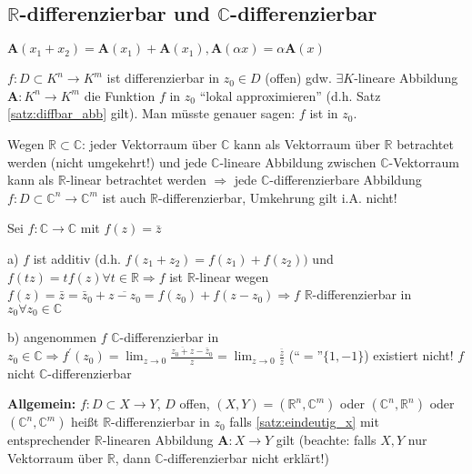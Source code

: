 \subsection{$\mathbb{R}$-differenzierbar und $\mathbb{C}$-differenzierbar}
    $\mathbf{A}(x_1+x_2) = \mathbf{A}(x_1) + \mathbf{A}(x_1), \mathbf{A}(\alpha x) = \alpha\mathbf{A}(x)$
    \begin{definition}[$K$-differenzierbar]
        $f: D \subset K^n \to K^m$ ist differenzierbar in $z_0 \in D$ (offen) gdw. $\exists K$-lineare Abbildung $\mathbf{A} : K^n \to K^m$ die Funktion $f$ in $z_0$ ``lokal approximieren'' (d.h. Satz \ref{satz:diffbar_abb} gilt). Man müsste genauer sagen: $f$ ist  in $z_0$.
    \end{definition}
    Wegen $\mathbb{R} \subset \mathbb{C}$: jeder Vektorraum über $\mathbb{C}$ kann als Vektorraum über $\mathbb{R}$ betrachtet werden (nicht umgekehrt!) und jede $\mathbb{C}$-lineare Abbildung zwischen $\mathbb{C}$-Vektorraum kann als $\mathbb{R}$-linear betrachtet werden $\Rightarrow$ jede $\mathbb{C}$-differenzierbare Abbildung $f: D \subset \mathbb{C}^n \to \mathbb{C}^m$ ist auch $\mathbb{R}$-differenzierbar, Umkehrung gilt i.A. nicht!
    \begin{beispiel}
        Sei $f: \mathbb{C} \to \mathbb{C}$ mit $f(z) = \bar{z}$
        \begin{compactitem}
            \item[a)] $f$ ist additiv (d.h. $f(z_1 + z_2) = f(z_1) + f(z_2))$ und $f(tz) = tf(z)\forall t \in \mathbb{R} \Rightarrow f$ ist $\mathbb{R}$-linear wegen $f(z) = \bar{z} = \bar{z}_0 + \overline{z - z_0} = f(z_0) + f(z-z_0) \Rightarrow f$ $\mathbb{R}$-differenzierbar in $z_0 \forall z_0 \in \mathbb{C}$
            \item[b)] angenommen $f$ $\mathbb{C}$-differenzierbar in $z_0 \in \mathbb{C} \Rightarrow f^{\prime}(z_0) = \lim_{z\to 0}\frac{\overline{z_0 + z} - \bar{z}_0}{z} = \lim_{z\to 0} \frac{\bar{z}}{z}$ (``$=$''$\{1,-1\}$) existiert nicht! $f$ nicht $\mathbb{C}$-differenzierbar
        \end{compactitem}
    \end{beispiel}
    \textbf{Allgemein:} $f: D \subset X \to Y$, $D$ offen, $(X,Y) = (\mathbb{R}^n,\mathbb{C}^m)$ oder $(\mathbb{C}^n,\mathbb{R}^n)$ oder $(\mathbb{C}^n,\mathbb{C}^m)$ heißt $\mathbb{R}$-differenzierbar in $z_0$ falls \ref{satz:eindeutig_x} mit entsprechender $\mathbb{R}$-linearen Abbildung $\mathbf{A}: X \to Y$ gilt (beachte: falls $X,Y$ nur Vektorraum über $\mathbb{R}$, dann $\mathbb{C}$-differenzierbar nicht erklärt!)
